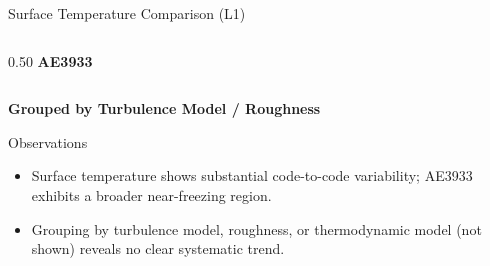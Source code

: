 \begin{frame}{\small  Surface Temperature Comparison (L1)}
{\begin{columns}[T,onlytextwidth]
\begin{column}{0.50\textwidth}
    {\scriptsize\textbf{AE3933}}
\end{column}

\end{columns}
}
\vspace{-0.05cm}
\centering
\textbf{Grouped by Turbulence Model / Roughness}
\vspace{-0.15cm}

\begin{block}{\scriptsize Observations}
\begin{itemize}
    \item<1-> Surface temperature shows substantial code-to-code variability; AE3933 exhibits a broader near-freezing region.
    \item<2-> Grouping by turbulence model, roughness, or thermodynamic model (not shown) reveals no clear systematic trend.
\end{itemize}
\end{block}

\end{frame}



